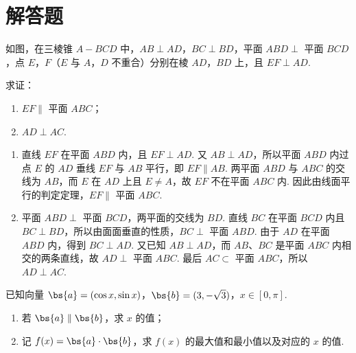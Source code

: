\section{解答题}

\begin{problem}
如图，在三棱锥 \(A-BCD\) 中，\(AB\perp AD\)，\(BC\perp BD\)，平面 \(ABD\perp\) 平面 \(BCD\)，点 \(E\)，\(F\)（\(E\) 与 \(A\)，\(D\) 不重合）分别在棱 \(AD\)，\(BD\) 上，且 \(EF\perp AD\).

求证：

\begin{enumerate}
\item \(EF\parallel\) 平面 \(ABC\)；
\item \(AD\perp AC\).
\end{enumerate}

\end{problem}

\begin{solution}
\begin{enumerate}
\item 直线 \(EF\) 在平面 \(ABD\) 内，且 \(EF\perp AD\). 又 \(AB\perp AD\)，所以平面 \(ABD\) 内过点 \(E\) 的 \(AD\) 垂线 \(EF\) 与 \(AB\) 平行，即 \(EF\parallel AB\). 两平面 \(ABD\) 与 \(ABC\) 的交线为 \(AB\)，而 \(E\) 在 \(AD\) 上且 \(E\ne A\)，故 \(EF\) 不在平面 \(ABC\) 内. 因此由线面平行的判定定理，\(EF\parallel\) 平面 \(ABC\).
\item 平面 \(ABD\perp\) 平面 \(BCD\)，两平面的交线为 \(BD\). 直线 \(BC\) 在平面 \(BCD\) 内且 \(BC\perp BD\)，所以由面面垂直的性质，\(BC\perp\) 平面 \(ABD\). 由于 \(AD\) 在平面 \(ABD\) 内，得到 \(BC\perp AD\). 又已知 \(AB\perp AD\)，而 \(AB\)、\(BC\) 是平面 \(ABC\) 内相交的两条直线，故 \(AD\perp\) 平面 \(ABC\). 最后 \(AC\subset\) 平面 \(ABC\)，所以 \(AD\perp AC\).
\end{enumerate}
\end{solution}


\begin{problem}
已知向量 \(\bs{a}=(\cos x,\sin x)\)，\(\bs{b}=(3,-\sqrt3)\)，\(x\in[0,\pi]\).

\begin{enumerate}
\item 若 \(\bs{a}\parallel \bs{b}\)，求 \(x\) 的值；
\item 记 \(f(x)=\bs{a}\cdot \bs{b}\)，求 \(f(x)\) 的最大值和最小值以及对应的 \(x\) 的值.
\end{enumerate}
\end{problem}

